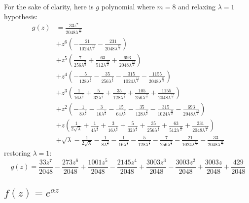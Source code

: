 For the sake of clarity, here is $g$ polynomial where $m=8$ and relaxing $\lambda=1$ hypothesis:
\begin{displaymath}
\begin{split}
g{\left (z \right )} &= \frac{33 z^{7}}{2048 \lambda^{\frac{13}{2}}} \\
&+ z^{6} \left(- \frac{21}{1024 \lambda^{\frac{11}{2}}} - \frac{231}{2048 \lambda^{\frac{13}{2}}}\right) \\
&+ z^{5} \left(\frac{7}{256 \lambda^{\frac{9}{2}}} + \frac{63}{512 \lambda^{\frac{11}{2}}} + \frac{693}{2048 \lambda^{\frac{13}{2}}}\right) \\
&+ z^{4} \left(- \frac{5}{128 \lambda^{\frac{7}{2}}} - \frac{35}{256 \lambda^{\frac{9}{2}}} - \frac{315}{1024 \lambda^{\frac{11}{2}}} - \frac{1155}{2048 \lambda^{\frac{13}{2}}}\right) \\
&+ z^{3} \left(\frac{1}{16 \lambda^{\frac{5}{2}}} + \frac{5}{32 \lambda^{\frac{7}{2}}} + \frac{35}{128 \lambda^{\frac{9}{2}}} + \frac{105}{256 \lambda^{\frac{11}{2}}} + \frac{1155}{2048 \lambda^{\frac{13}{2}}}\right) \\
&+ z^{2} \left(- \frac{1}{8 \lambda^{\frac{3}{2}}} - \frac{3}{16 \lambda^{\frac{5}{2}}} - \frac{15}{64 \lambda^{\frac{7}{2}}} - \frac{35}{128 \lambda^{\frac{9}{2}}} - \frac{315}{1024 \lambda^{\frac{11}{2}}} - \frac{693}{2048 \lambda^{\frac{13}{2}}}\right) \\
&+ z \left(\frac{1}{2 \sqrt{\lambda}} + \frac{1}{4 \lambda^{\frac{3}{2}}} + \frac{3}{16 \lambda^{\frac{5}{2}}} + \frac{5}{32 \lambda^{\frac{7}{2}}} + \frac{35}{256 \lambda^{\frac{9}{2}}} \right. + \left. \frac{63}{512 \lambda^{\frac{11}{2}}} + \frac{231}{2048 \lambda^{\frac{13}{2}}}\right) \\
&+ \sqrt{\lambda} - \frac{1}{2 \sqrt{\lambda}} - \frac{1}{8 \lambda^{\frac{3}{2}}} - \frac{1}{16 \lambda^{\frac{5}{2}}} - \frac{5}{128 \lambda^{\frac{7}{2}}} - \frac{7}{256 \lambda^{\frac{9}{2}}} - \frac{21}{1024 \lambda^{\frac{11}{2}}} - \frac{33}{2048 \lambda^{\frac{13}{2}}}
\end{split}
\end{displaymath}
restoring $\lambda=1$:
\begin{displaymath}
g{\left (z \right )} = \frac{33 z^{7}}{2048} - \frac{273 z^{6}}{2048} + \frac{1001 z^{5}}{2048} - \frac{2145 z^{4}}{2048} + \frac{3003 z^{3}}{2048} - \frac{3003 z^{2}}{2048} + \frac{3003 z}{2048} + \frac{429}{2048}
\end{displaymath}

\subsection{$f(z)=e^{\alpha z}$}

